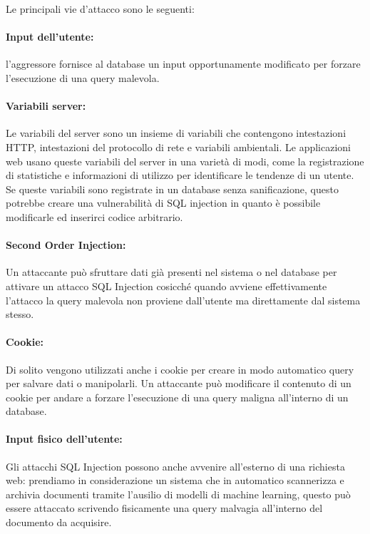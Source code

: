 Le principali vie d'attacco sono le seguenti:

\paragraph{Input dell'utente:}
l'aggressore fornisce al database un input opportunamente modificato per
forzare l'esecuzione di una query malevola.

\paragraph{Variabili server:}
Le variabili del server sono un insieme di variabili che contengono intestazioni
HTTP, intestazioni del protocollo di rete e variabili ambientali. Le
applicazioni web usano queste variabili del server in una varietà di modi, come
la registrazione di statistiche e informazioni di utilizzo per identificare le
tendenze di un utente. Se queste variabili sono registrate in un database senza
sanificazione, questo potrebbe creare una vulnerabilità di SQL injection in
quanto è possibile modificarle ed inserirci codice arbitrario.

\paragraph{Second Order Injection:}
Un attaccante può sfruttare dati già presenti nel sistema o nel database per
attivare un attacco SQL Injection cosicché quando avviene effettivamente
l'attacco la query malevola non proviene dall'utente ma direttamente dal sistema
stesso.

\paragraph{Cookie:}
Di solito vengono utilizzati anche i cookie per creare in modo automatico query
per salvare dati o manipolarli. Un attaccante può modificare il contenuto di un
cookie per andare a forzare l'esecuzione di una query maligna all'interno di un
database.

\paragraph{Input fisico dell'utente:}
Gli attacchi SQL Injection possono anche avvenire all'esterno di una richiesta
web: prendiamo in considerazione un sistema che in automatico scannerizza e
archivia documenti tramite l'ausilio di modelli di machine learning, questo può
essere attaccato scrivendo fisicamente una query malvagia all'interno del
documento da acquisire.


